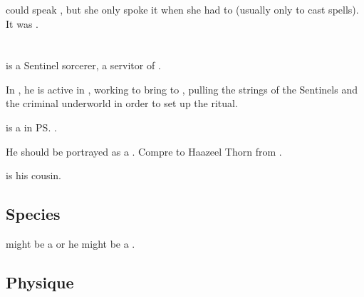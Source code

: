 \subsubsection{\TrueDraconic}
\Criseis could speak \TrueDraconic, but she only spoke it when she had to (usually only to cast spells).
It was . 















\section[Locar Psyrex]{\LocarPsyrex}
\index{\LocarPsyrex}
\index{\Psyrex}
\LocarPsyrex{} is a \scathaese{} Sentinel \chaos{} sorcerer, a servitor of \Secherdamon. 

In \emph{\TwilightAngelRemember{}}, he is active in \Malcur, working to bring \Nithd{} to \Miith{}, pulling the strings of the \Malcuric{} Sentinels and the criminal underworld in order to set up the ritual. 

\Psyrex{} is a \vertex{} in \ps{\Secherdamon} \matrix. 

He should be portrayed as a  . Compre to Haazeel Thorn from \FLuneNoire. 


 is his cousin. 









\subsection{Species}
\LocarPsyrex might be a \scatha or he might be a \quiljaar. 









\subsection{Physique}





